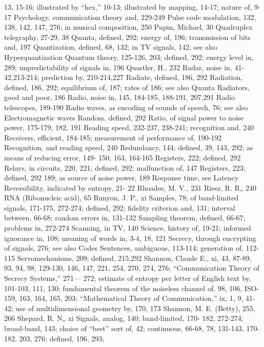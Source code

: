 {{{{{{{{{{{{{{{13, 15-16; illustrated by
“hex,” 10-13; illustrated by mapping,
14-17; nature of, 9-17
Psychology, communication theory and,
229-249
Pulse code modulation, 132, 138, 142,
147, 276; in musical composition,
250
Pupin, Michael, 30
Quadruplex telegraphy, 27-29, 38
Quanta, defined, 292; energy of, 196;
transmission of bits and, 197
Quantization, defined, 68, 132; in TV
signals, 142; see also Hyperquantization
Quantum theory, 125-126, 203; defined,
292; energy level in, 289; unpredictability
of signals in, 196
Quastler, H., 232
Radar, noise in, 41-42,213-214; prediction
by, 210-214,227
Radiate, defined, 186, 292
Radiation, defined, 186, 292; equilibrium
of, 187; rates of 186; see also
Quanta
Radiators, good and poor, 186
Radio, noise in, 145, 184-185, 188-191,
207,291
Radio telescopes, 189-190
Radio waves, as encoding of sounds of
speech, 76; see also Electromagnetic
waves
Random, defined, 292
Ratio, of signal power to noise power,
175-179, 182, 191
Reading speed, 232-237, 238-241; recognition
and, 240
Receivers, efficient, 184-185; measurement
of performance of, 190-192
Recognition, and reading speed, 240
Redundancy, 144; defined, 39, 143, 292;
as means of reducing error, 149-
150, 163, 164-165
Registers, 222; defined, 292
Relays, in circuits, 220, 221; defined,
292; malfunction of, 147
Registers, 223; defined, 292
189; as source of noise power, 189
Response time, see Latency
Reversibility, indicated by entropy, 21-
22
Rhoades, M. V., 231
Riesz, R. R„ 240
RNA (Ribonucleic acid), 65
Runyon, J. P., xi
Samples, 78; of band-limited signals,
171-175, 272-274; defined, 292;
fidelity criterion and, 131; interval
between, 66-68; random errors in,
131-132
Sampling theorem, defined, 66-67;
problems in, 272-274
Scanning, in TV, 140
Science, history of, 19-21; informed
ignorance in, 108; meaning of
words in, 3-4, 18, 121
Secrecy, through encrypting of signals,
276; see also Codes
Sentences, ambiguous, 113-114; generation
of, 112-115
Servomechanisms, 209; defined, 215,292
Shannon, Claude E., xi, 43, 87-89, 93,
94, 98, 129-130, 146, 147, 221, 254,
270, 274, 276; “Communication
Theory of Secrecy Systems,” 271—
272; estimate of entropy per letter
of English text by, 101-103, 111,
130; fundamental theorem of the
noiseless channel of, 98, 106, ISO-
159, 163, 164, 165, 203; “Mathematical
Theory of Communication,”
ix, 1, 9, 41-42; use of multidimensional
geometry by, 170, 173
Shannon, M. E. (Betty), 255, 266
Shepard, R. N„ xi
Signals, analog, 140; band-limited, 170-
182, 272-274; broad-band, 143;
choice of “best” sort of, 42; continuous,
66-68, 78, 131-143, 170-
182, 203, 276; defined, 196, 293;
}}}}}}}}}}}}}}}
